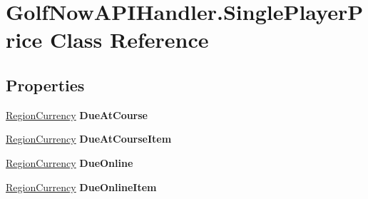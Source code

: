 \hypertarget{class_golf_now_a_p_i_handler_1_1_single_player_price}{}\section{Golf\+Now\+A\+P\+I\+Handler.\+Single\+Player\+Price Class Reference}
\label{class_golf_now_a_p_i_handler_1_1_single_player_price}
\subsection*{Properties}
\begin{DoxyCompactItemize}
\item 
\mbox{\label{class_golf_now_a_p_i_handler_1_1_single_player_price_a3ec17eb635ae75e5de1f1a01d48ce4d4}} 
\mbox{\hyperlink{class_golf_now_a_p_i_handler_1_1_region_currency}{Region\+Currency}} {\bfseries Due\+At\+Course}
\item 
\mbox{\label{class_golf_now_a_p_i_handler_1_1_single_player_price_a4c90437a38e4ab47cbff88436451f791}} 
\mbox{\hyperlink{class_golf_now_a_p_i_handler_1_1_region_currency}{Region\+Currency}} {\bfseries Due\+At\+Course\+Item}
\item 
\mbox{\label{class_golf_now_a_p_i_handler_1_1_single_player_price_ad55942db28b3a520aa4aa08ee805552e}} 
\mbox{\hyperlink{class_golf_now_a_p_i_handler_1_1_region_currency}{Region\+Currency}} {\bfseries Due\+Online}
\item 
\mbox{\label{class_golf_now_a_p_i_handler_1_1_single_player_price_aabf97ea99bcd3c317ddba5c509d032c5}} 
\mbox{\hyperlink{class_golf_now_a_p_i_handler_1_1_region_currency}{Region\+Currency}} {\bfseries Due\+Online\+Item}
\item 
\mbox{\label{class_golf_now_a_p_i_handler_1_1_single_player_price_a8aa1a9bb43239c0f8795e7cd26a41433}} 

\end{DoxyCompactItemize}
